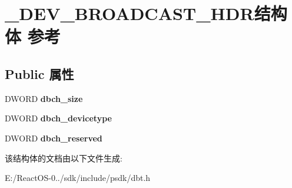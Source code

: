 \hypertarget{struct___d_e_v___b_r_o_a_d_c_a_s_t___h_d_r}{}\section{\+\_\+\+D\+E\+V\+\_\+\+B\+R\+O\+A\+D\+C\+A\+S\+T\+\_\+\+H\+D\+R结构体 参考}
\label{struct___d_e_v___b_r_o_a_d_c_a_s_t___h_d_r}
\subsection*{Public 属性}
\begin{DoxyCompactItemize}
\item 
\mbox{\label{struct___d_e_v___b_r_o_a_d_c_a_s_t___h_d_r_aba5825c9514ca3e311354b6763a738a5}} 
D\+W\+O\+RD {\bfseries dbch\+\_\+size}
\item 
\mbox{\label{struct___d_e_v___b_r_o_a_d_c_a_s_t___h_d_r_a26d9174ada742a4c3cb77aa20aac7ad0}} 
D\+W\+O\+RD {\bfseries dbch\+\_\+devicetype}
\item 
\mbox{\label{struct___d_e_v___b_r_o_a_d_c_a_s_t___h_d_r_a85760431e07a2864ae5fcf522fa21ff2}} 
D\+W\+O\+RD {\bfseries dbch\+\_\+reserved}
\end{DoxyCompactItemize}


该结构体的文档由以下文件生成\+:\begin{DoxyCompactItemize}
\item 
E\+:/\+React\+O\+S-\/0../sdk/include/psdk/dbt.\+h\end{DoxyCompactItemize}
